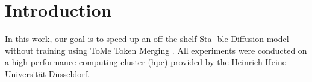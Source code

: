 \section{Introduction}
In this work, our goal is to speed up an off-the-shelf Sta-
ble Diffusion model without training using ToMe
Token Merging \cite{bolya2023tomesd}.
All experiments were conducted on a high performance computing cluster (hpc) provided by the Heinrich-Heine-Universität Düsseldorf.